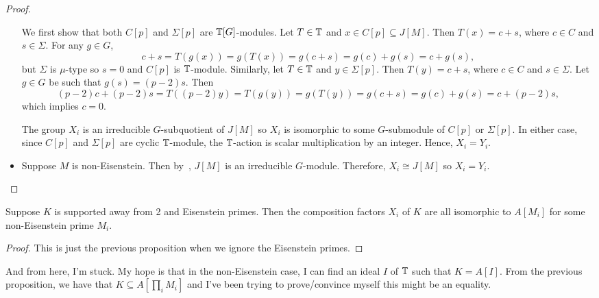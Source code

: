 \documentclass{article}
\begin{document}
\begin{proof}
\begin{itemize}
            We first show that both $C[p]$ and $\Sigma[p]$ are $\mathbb{T}[G]$-modules.
            Let $T\in \mathbb{T}$ and $x \in C[p]\subseteq J[M]$. Then $T(x) = c+s$,
            where $c\in C$ and $s\in \Sigma$. For any $g\in G$,
            \[
                c+s = T(g(x)) = g(T(x)) = g(c+s) = g(c) + g(s) = c+g(s),
            \]
            but $\Sigma$ is $\mu$-type so $s=0$ and $C[p]$ is $\mathbb{T}$-module.
            Similarly, let $T\in \mathbb{T}$ and $y\in \Sigma[p]$. Then $T(y) = c+s$,
            where $c\in C$ and $s\in \Sigma$. Let $g\in G$ be such that $g(s) =
            (p-2)s$. Then
            \[
                (p-2)c + (p-2)s=T((p-2)y)=T(g(y)) = g(T(y)) = g(c+s) =
                g(c)+g(s) = c + (p-2)s,
            \]
            which implies $c=0$.

            The group $X_i$ is an irreducible $G$-subquotient of $J[M]$ so
            $X_i$ is isomorphic to some $G$-submodule of $C[p]$ or $\Sigma[p]$.
            In either case, since $C[p]$ and $\Sigma[p]$ are cyclic
            $\mathbb{T}$-module, the $\mathbb{T}$-action is scalar multiplication by an
            integer. Hence, $X_i = Y_i$.
        \item
            Suppose $M$ is non-Eisenstein. Then by~\cite[14.12, pg.
            122]{mazur:eisenstein}, $J[M]$ is an irreducible $G$-module.
            Therefore, $X_i \cong J[M]$ so $X_i = Y_i$.
    \end{itemize}
\end{proof}

\begin{proposition}
    Suppose $K$ is supported away from 2 and Eisenstein primes. Then the
    composition factors $X_i$ of $K$ are all isomorphic to $A[M_i]$ for some
    non-Eisenstein prime $M_i$.
\end{proposition}
\begin{proof}
    This is just the previous proposition when we ignore the Eisenstein primes.
\end{proof}

And from here, I'm stuck. My hope is that in the non-Eisenstein case, I can find
an ideal $I$ of $\mathbb{T}$ such that $K=A[I]$. From the previous proposition,
we have that $K \subseteq A[\prod_i M_i]$ and I've been trying to
prove/convince myself this might be an equality.


\end{document}
